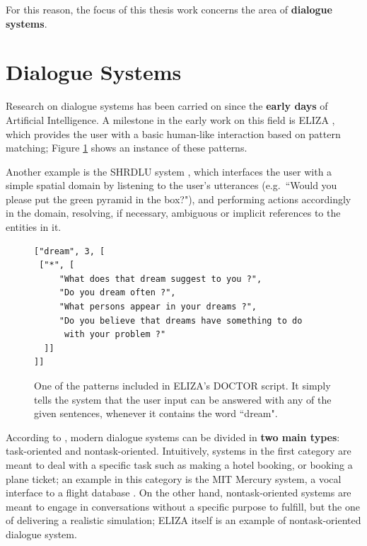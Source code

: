 For this reason, the focus of this thesis work concerns the area of \textbf{dialogue systems}.

\section{Dialogue Systems}\label{ch:introduction:ds}
Research on dialogue systems has been carried on since the \textbf{early days} of Artificial Intelligence. A milestone in the early work on this field is ELIZA \citep{Weizenbaum:1966:ECP:365153.365168}, which provides the user with a basic human-like interaction based on pattern matching; Figure \ref{ch:rw:ds:ELIZA} shows an instance of these patterns.

Another example is the SHRDLU system \citep{winograd1971procedure}, which interfaces the user with a simple spatial domain by listening to the user's utterances (e.g.\ ``Would you please put the green pyramid in the box?"), and performing actions accordingly in the domain, resolving, if necessary, ambiguous or implicit references to the entities in it.

\begin{figure}
\begin{Verbatim}[frame=single]
["dream", 3, [
 ["*", [
     "What does that dream suggest to you ?",
     "Do you dream often ?",
     "What persons appear in your dreams ?",
     "Do you believe that dreams have something to do
      with your problem ?"
  ]]
]]
\end{Verbatim}
\caption{One of the patterns included in ELIZA's DOCTOR script. It simply tells the system that the user input can be answered with any of the given sentences, whenever it contains the word ``dream".}
\label{ch:rw:ds:ELIZA}
\end{figure}

According to \cite{Jokinen2009}, modern dialogue systems can be divided in \textbf{two main types}: task-oriented and nontask-oriented. Intuitively, systems in the first category are meant to deal with a specific task such as making a hotel booking, or booking a plane ticket; an example in this category is the MIT Mercury system, a vocal interface to a flight database \citep{Seneff:2000:DMM:1605285.1605288}. On the other hand, nontask-oriented systems are meant to engage in conversations without a specific purpose to fulfill, but the one of delivering a realistic simulation; ELIZA itself is an example of nontask-oriented dialogue system.

